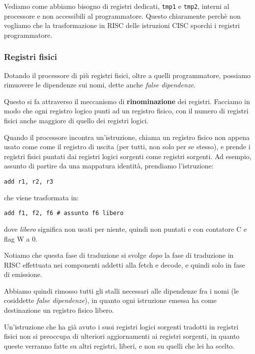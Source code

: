\documentclass[a4paper,11pt]{article}
\begin{document}
Vediamo come abbiamo bisogno di registri dedicati, \lstinline|tmp1| e \lstinline|tmp2|, interni al processore e non accessibili al programmatore.
Questo chiaramente perchè non vogliamo che la trasformazione in RISC delle istruzioni CISC sporchi i registri programmatore.

\subsubsection{Registri fisici}
Dotando il processore di più registri fisici, oltre a quelli programmatore, possiamo rimuovere le dipendenze sui nomi, dette anche \textit{false dipendenze}. 

Questo si fa attraverso il meccanismo di \textbf{rinominazione} dei registri.
Facciamo in modo che ogni registro logico punti ad un registro fisico, con il numero di registri fisici anche maggiore di quello dei registri logici.

Quando il processore incontra un'istruzione, chiama un registro fisico non appena usato come come il registro di uscita (per tutti, non solo per se stesso), e prende i registri fisici puntati dai registri logici sorgenti come registri sorgenti.
Ad esempio, assunto di partire da una mappatura identità, prendiamo l'istruzione:
\begin{lstlisting}	
add r1, r2, r3
\end{lstlisting}
che viene trasformata in:
\begin{lstlisting}	
add f1, f2, f6 # assunto f6 libero
\end{lstlisting}
dove \textit{libero} significa non usati per niente, quindi non puntati e con contatore C e flag W a 0.

Notiamo che questa fase di traduzione si svolge \textit{dopo} la fase di traduzione in RISC effettuata nei componenti addetti alla fetch e decode, e quindi solo in fase di emissione.

Abbiamo quindi rimosso tutti gli stalli necessari alle dipendenze fra i nomi (le cosiddette \textit{false dipendenze}), in quanto ogni istruzione emessa ha come destinazione un registro fisico libero.

Un'istruzione che ha già avuto i suoi registri logici sorgenti tradotti in registri fisici non si preoccupa di ulteriori aggiornamenti ai registri sorgenti, in quanto queste verranno fatte su altri registri, liberi, e non su quelli che lei ha scelto.

\par \medskip
\end{document}
